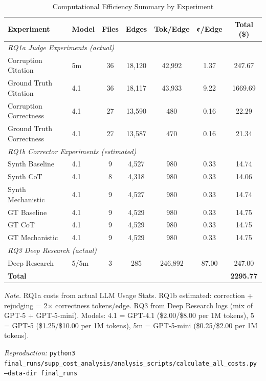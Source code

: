 \begin{table}[H]
\centering
\caption{Computational Efficiency Summary by Experiment}
\label{tab:scaling_summary}
\footnotesize
\begin{tabular}{llccccc}
\toprule
\textbf{Experiment} & \textbf{Model} & \textbf{Files} & \textbf{Edges} & \textbf{Tok/Edge} & \textbf{¢/Edge} & \textbf{Total (\$)} \\
\midrule
\multicolumn{7}{l}{\textit{RQ1a Judge Experiments (actual)}} \\
Corruption Citation & 5m & 36 & 18,120 & 42,992 & 1.37 & 247.67 \\
Ground Truth Citation & 4.1 & 36 & 18,117 & 43,933 & 9.22 & 1669.69 \\
Corruption Correctness & 4.1 & 27 & 13,590 & 480 & 0.16 & 22.29 \\
Ground Truth Correctness & 4.1 & 27 & 13,587 & 470 & 0.16 & 21.34 \\
\midrule
\multicolumn{7}{l}{\textit{RQ1b Corrector Experiments (estimated)}} \\
Synth Baseline & 4.1 & 9 & 4,527 & 980 & 0.33 & 14.74 \\
Synth CoT & 4.1 & 8 & 4,318 & 980 & 0.33 & 14.06 \\
Synth Mechanistic & 4.1 & 9 & 4,527 & 980 & 0.33 & 14.74 \\
GT Baseline & 4.1 & 9 & 4,529 & 980 & 0.33 & 14.75 \\
GT CoT & 4.1 & 9 & 4,529 & 980 & 0.33 & 14.75 \\
GT Mechanistic & 4.1 & 9 & 4,529 & 980 & 0.33 & 14.75 \\
\midrule
\multicolumn{7}{l}{\textit{RQ3 Deep Research (actual)}} \\
Deep Research & 5/5m & 3 & 285 & 246,892 & 87.00 & 247.00 \\
\midrule
\textbf{Total} & & & & & & \textbf{2295.77} \\
\bottomrule
\end{tabular}
\begin{tablenotes}
\small
\item \textit{Note.} RQ1a costs from actual LLM Usage Stats. RQ1b estimated: correction + rejudging = 2$\times$ correctness tokens/edge. RQ3 from Deep Research logs (mix of GPT-5 + GPT-5-mini). Models: 4.1 = GPT-4.1 (\$2.00/\$8.00 per 1M tokens), 5 = GPT-5 (\$1.25/\$10.00 per 1M tokens), 5m = GPT-5-mini (\$0.25/\$2.00 per 1M tokens).
\item \textit{Reproduction:} \texttt{python3 final\_runs/supp\_cost\_analysis/analysis\_scripts/calculate\_all\_costs.py --data-dir final\_runs}
\end{tablenotes}
\end{table}